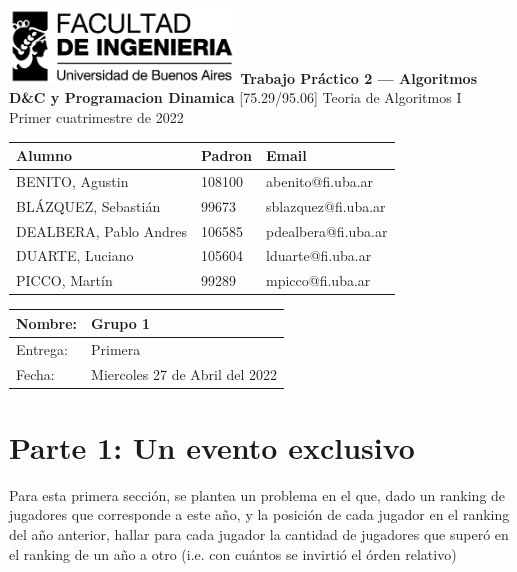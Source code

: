 \documentclass[titlepage,a4paper]{article}
\author{Pablo Andres Dealbera}
\date{\today}
\title{}
\begin{document}
\begin{titlepage}
	\hfill\includegraphics[width=6cm]{assets/logofiuba.jpg}
    \centering
    \vfill
    \Huge \textbf{Trabajo Práctico 2 — Algoritmos D\&C y Programacion Dinamica}
    \vskip2cm
    \Large [75.29/95.06] Teoria de Algoritmos I\\
    Primer cuatrimestre de 2022\\
    \vfill
    \begin{tabular}{ | l | l | l | }
      \hline
      Alumno & Padron & Email \\ \hline
      BENITO, Agustin & 108100 & abenito@fi.uba.ar \\ \hline
      BLÁZQUEZ, Sebastián & 99673 & sblazquez@fi.uba.ar \\ \hline
      DEALBERA, Pablo Andres & 106585 & pdealbera@fi.uba.ar \\ \hline
      DUARTE, Luciano & 105604 & lduarte@fi.uba.ar \\ \hline
      PICCO, Martín & 99289 & mpicco@fi.uba.ar \\ \hline
  	\end{tabular}
    \vfill
    \begin{tabular}{ | l | l | }
      \hline
      Nombre: & Grupo 1 \\ \hline
      Entrega: & Primera \\ \hline
      Fecha: & Miercoles 27 de Abril del 2022 \\ \hline
  	\end{tabular}
    \vfill
    \vfill
\end{titlepage}
\tableofcontents
\newpage
{}

\section{Parte 1: Un evento exclusivo}
\label{sec:orga07dab6}

Para esta primera sección, se plantea un problema en el que, dado un ranking 
de jugadores que corresponde a este año, y la posición de cada jugador en el 
ranking del año anterior, hallar para cada jugador la cantidad de jugadores
que superó en el ranking de un año a otro (i.e. con cuántos se invirtió el
órden relativo)
\end{document}
